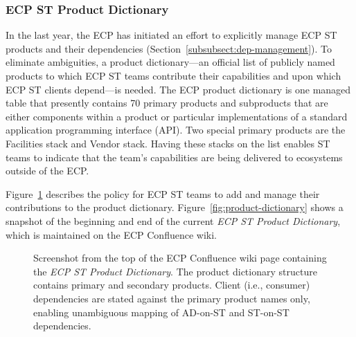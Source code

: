 \subsubsection{ECP ST Product Dictionary}\label{subsubsect:dictionary}
In the last year, the ECP has initiated an effort to explicitly manage ECP ST products and their dependencies (Section~\ref{subsubsect:dep-management}).  To eliminate ambiguities, a product dictionary---an official list of publicly named products to which ECP ST teams contribute their capabilities and upon which ECP ST clients depend---is needed.  The ECP product dictionary is one managed table that presently contains 70 primary products and subproducts that are either components within a product or particular implementations of a standard application programming interface (API).  Two special primary products are the Facilities stack and Vendor stack.  Having these stacks on the list enables ST teams to indicate that the team's capabilities are being delivered to ecosystems outside of the ECP.

Figure~\ref{fig:product-dictionary-overview} describes the policy for ECP ST teams to add and manage their contributions to the product dictionary.  Figure~\ref{fig:product-dictionary} shows a snapshot of the beginning and end of the current \textit{ECP ST Product Dictionary}, which is maintained on the ECP Confluence wiki. 

\begin{figure}
	\centering
	\caption{Screenshot from the top of the ECP Confluence wiki page containing the \textit{ECP ST Product Dictionary}.  The product dictionary structure contains primary and secondary products.  Client (i.e., consumer) dependencies are stated against the primary product names only, enabling unambiguous mapping of AD-on-ST and ST-on-ST dependencies.}
	\label{fig:product-dictionary-overview}
\end{figure}

